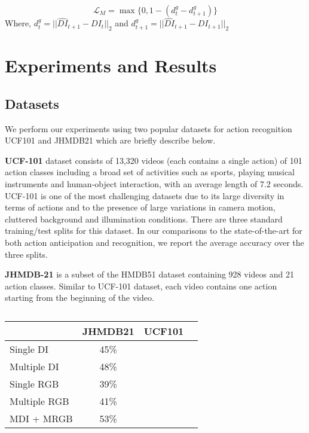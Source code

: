\documentclass[10pt,twocolumn,letterpaper]{article}
\begin{document}
\begin{equation}
 \mathcal{L}_{M} = \max\{0, 1 - (d_{t}^g - d_{t+1}^g)\}
\end{equation}
Where, $d_{t}^g = || \hat{DI}_{t+1} - DI_{t} ||_2$ and $d_{t+1}^g = || \hat{DI}_{t+1} - DI_{t+1} ||_2$

\section{Experiments and Results}
\subsection{Datasets}

We perform our experiments using two popular datasets for action recognition UCF101 \cite{soomro2012ucf101} and JHMDB21 \cite{jhuang2013towards} which are briefly describe below.

\textbf{UCF-101} dataset consists of 13,320 videos (each contains a single action) of 101 action classes including a broad set of activities such as sports, playing musical instruments and human-object interaction, with an average length of 7.2 seconds. UCF-101 is one of the most challenging datasets due to its large diversity in terms of actions and to the presence of large variations in camera motion, cluttered background and illumination conditions. There are three standard training/test splits for this dataset. In our comparisons to the state-of-the-art for both action anticipation and recognition, we report the average accuracy over the three splits.

\textbf{JHMDB-21} is a subset of the HMDB51 dataset containing 928 videos and 21 action classes. Similar to UCF-101 dataset, each video contains one action starting from the beginning of the video.
\subsection{}
\begin{table}[ht!]
    \centering
  \begin{tabular}{lccc}
  \hline
  & \textbf{JHMDB21} & \textbf{UCF101} \\ \hline
Single DI & 45\% & \\ 
Multiple DI & 48\% &\\
Single RGB  & 39\%  & \\
Multiple RGB & 41\% & \\ 
MDI + MRGB  & 53\% &\\ 
\hline
  \end{tabular}
\end{table}
\end{document}
